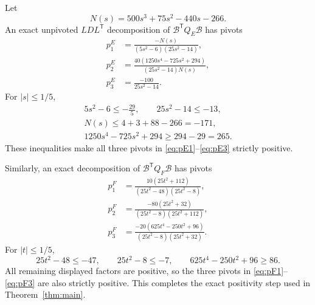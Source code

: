 \documentclass[11pt,a4paper]{article}
\theoremstyle{remark}
\begin{document}
Let
\begin{equation}
 N(s)=500s^3+75s^2-440s-266.
\end{equation}
An exact unpivoted $LDL^{\mathsf T}$ decomposition of
$\mathcal B^{\mathsf T}Q_E\mathcal B$ has pivots
\begin{align}
 p^E_1&=\frac{-N(s)}{(5s^2-6)(25s^2-14)},\label{eq:pE1}\\
 p^E_2&=\frac{40(1250s^4-725s^2+294)}
 {(25s^2-14)N(s)},\label{eq:pE2}\\
 p^E_3&=\frac{-100}{25s^2-14}.\label{eq:pE3}
\end{align}
For $|s|\leq1/5$,
\begin{gather}
 5s^2-6\leq-\frac{29}{5},\qquad 25s^2-14\leq-13,\\
 N(s)\leq4+3+88-266=-171,\\
 1250s^4-725s^2+294\geq294-29=265.
\end{gather}
These inequalities make all three pivots in
\eqref{eq:pE1}--\eqref{eq:pE3} strictly positive.

Similarly, an exact decomposition of
$\mathcal B^{\mathsf T}Q_F\mathcal B$ has pivots
\begin{align}
 p^F_1&=\frac{10(25t^2+112)}
 {(25t^2-48)(25t^2-8)},\label{eq:pF1}\\
 p^F_2&=\frac{-80(25t^2+32)}
 {(25t^2-8)(25t^2+112)},\label{eq:pF2}\\
 p^F_3&=\frac{-20(625t^4-250t^2+96)}
 {(25t^2-8)(25t^2+32)}.\label{eq:pF3}
\end{align}
For $|t|\leq1/5$,
\begin{equation}
 25t^2-48\leq-47,\qquad 25t^2-8\leq-7,
 \qquad 625t^4-250t^2+96\geq86.
\end{equation}
All remaining displayed factors are positive, so the three pivots in
\eqref{eq:pF1}--\eqref{eq:pF3} are also strictly positive.  This completes
the exact positivity step used in Theorem~\ref{thm:main}.



\end{document}

